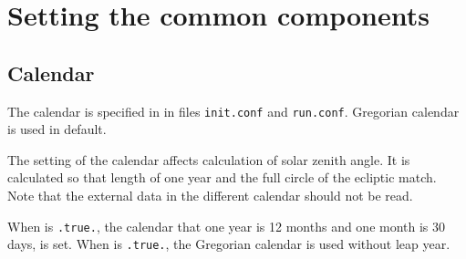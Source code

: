 \section{Setting the common components} \label{sec:common}

\subsection{Calendar} \label{subsec:calendar}

The calendar is specified in  in files \verb|init.conf| and \verb|run.conf|.
Gregorian calendar is used in default.


\noindent
The setting of the calendar affects calculation of solar zenith angle.
It is calculated so that length of one year and the full circle of the ecliptic match.
Note that the external data in the different calendar should not be read.

When  is \verb|.true.|,
the calendar that one year is 12 months and one month is 30 days, is set.
%
When  is \verb|.true.|,
the Gregorian calendar is used without leap year.
